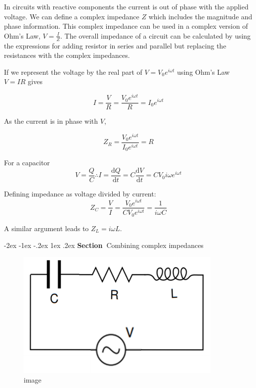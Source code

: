 \documentclass[
]{book}
\makeatletter
\renewcommand\section{%
\@startsection{section}{1}{\z@}%
              {-2ex \@plus -1ex \@minus -.2ex}%
              {1ex \@plus .2ex}%
              {\sffamily\bfseries\large\noindent Section~}}
\numberwithin{equation}{section}
\makeatother
\begin{document}
In circuits with reactive components the current is out of phase with
the applied voltage. We can define a complex impedance \(Z\) which
includes the magnitude and phase information. This complex impedance can
be used in a complex version of Ohm's Law, \(V = \frac{I}{Z}\). The
overall impedance of a circuit can be calculated by using the
expressions for adding resistor in series and parallel but replacing the
resistances with the complex impedances.

If we represent the voltage by the real part of \(V = V_0 e^{i\omega t}\)
using Ohm's Law \(V = IR\) gives

\begin{equation}
\label{eq:IvsT}
I = \frac{V}{R} = \frac{ V_0 e^{i\omega t} }{R} = I_0 e^{i\omega t}
\end{equation}

As the current is in phase with \(V\),

\begin{equation}
\label{eq:impedanceVI}
Z_R = \frac{V_0 e^{i\omega t} }{ I_0 e^{i\omega t}} = R
\end{equation}

For a capacitor
\begin{equation}
\label{eq:foraCapacitor}
V = \frac{Q}{C} \therefore I = \frac{\mathrm{d} Q}{\mathrm{d} t} = C \frac{\mathrm{d} V}{\mathrm{d} t} = C V_0 i \omega e^{i\omega t}
\end{equation}

Defining impedance as voltage divided by current:
\begin{equation}
\label{eq:ZVI}
Z_C = \frac{V}{I} = \frac{V_0 e^{i\omega t} }{C V_0 e^{i\omega t}} = \frac{1}{i\omega C}
\end{equation}

A similar argument leads to \(Z_L = i\omega L\).

\hypertarget{combining-complex-impedances}{%
\section{Combining complex impedances}\label{combining-complex-impedances}}

\begin{figure}
\centering
\includegraphics[width=100mm,height=\textheight]{Figures/LCR_circuit.png}
\caption{image}
\end{figure}
\end{document}
